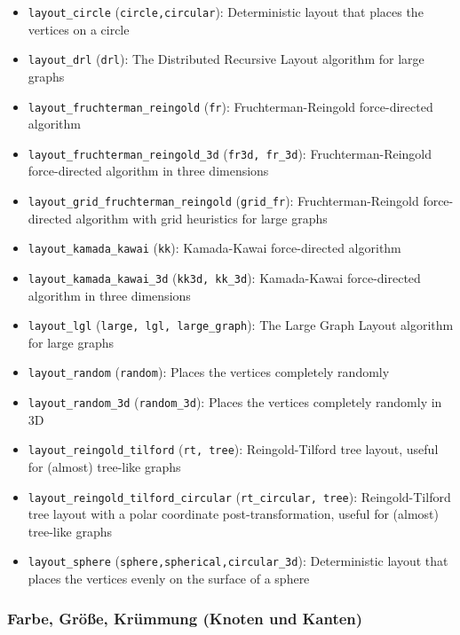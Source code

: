 \documentclass[11pt]{article}
\providecommand{\tightlist}{%
      \setlength{\itemsep}{0pt}\setlength{\parskip}{0pt}}
\begin{document}
\begin{itemize}
\tightlist
\item
  \texttt{layout\_circle} (\texttt{circle,circular}): Deterministic
  layout that places the vertices on a circle
\item
  \texttt{layout\_drl} (\texttt{drl}): The Distributed Recursive Layout
  algorithm for large graphs
\item
  \texttt{layout\_fruchterman\_reingold} (\texttt{fr}):
  Fruchterman-Reingold force-directed algorithm
\item
  \texttt{layout\_fruchterman\_reingold\_3d} (\texttt{fr3d,\ fr\_3d}):
  Fruchterman-Reingold force-directed algorithm in three dimensions
\item
  \texttt{layout\_grid\_fruchterman\_reingold} (\texttt{grid\_fr}):
  Fruchterman-Reingold force-directed algorithm with grid heuristics for
  large graphs
\item
  \texttt{layout\_kamada\_kawai} (\texttt{kk}): Kamada-Kawai
  force-directed algorithm
\item
  \texttt{layout\_kamada\_kawai\_3d} (\texttt{kk3d,\ kk\_3d}):
  Kamada-Kawai force-directed algorithm in three dimensions
\item
  \texttt{layout\_lgl} (\texttt{large,\ lgl,\ large\_graph}): The Large
  Graph Layout algorithm for large graphs
\item
  \texttt{layout\_random} (\texttt{random}): Places the vertices
  completely randomly
\item
  \texttt{layout\_random\_3d} (\texttt{random\_3d}): Places the vertices
  completely randomly in 3D
\item
  \texttt{layout\_reingold\_tilford} (\texttt{rt,\ tree}):
  Reingold-Tilford tree layout, useful for (almost) tree-like graphs
\item
  \texttt{layout\_reingold\_tilford\_circular}
  (\texttt{rt\_circular,\ tree}): Reingold-Tilford tree layout with a
  polar coordinate post-transformation, useful for (almost) tree-like
  graphs
\item
  \texttt{layout\_sphere} (\texttt{sphere,spherical,circular\_3d}):
  Deterministic layout that places the vertices evenly on the surface of
  a sphere
\end{itemize}

    \hypertarget{farbe-gruxf6uxdfe-kruxfcmmung-knoten-und-kanten}{%
\subsubsection{Farbe, Größe, Krümmung (Knoten und
Kanten)}\label{farbe-gruxf6uxdfe-kruxfcmmung-knoten-und-kanten}}
\end{document}
